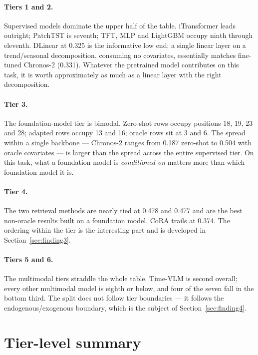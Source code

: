 \paragraph{Tiers 1 and 2.} Supervised models dominate the upper half of the table.
iTransformer leads outright; PatchTST is seventh; TFT, MLP and LightGBM occupy ninth
through eleventh. DLinear at 0.325 is the informative low end: a single linear layer on a
trend/seasonal decomposition, consuming no covariates, essentially matches fine-tuned
Chronos-2 (0.331). Whatever the pretrained model contributes on this task, it is worth
approximately as much as a linear layer with the right decomposition.

\paragraph{Tier 3.} The foundation-model tier is bimodal. Zero-shot rows occupy positions
18, 19, 23 and 28; adapted rows occupy 13 and 16; oracle rows sit at 3 and 6. The spread
within a single backbone --- Chronos-2 ranges from 0.187 zero-shot to 0.504 with oracle
covariates --- is larger than the spread across the entire supervised tier. On this task,
what a foundation model is \emph{conditioned on} matters more than which foundation model it
is.

\paragraph{Tier 4.} The two retrieval methods are nearly tied at 0.478 and 0.477 and are the
best non-oracle results built on a foundation model. CoRA trails at 0.374. The ordering
within the tier is the interesting part and is developed in Section~\ref{sec:finding3}.

\paragraph{Tiers 5 and 6.} The multimodal tiers straddle the whole table. Time-VLM is second
overall; every other multimodal model is eighth or below, and four of the seven fall in the
bottom third. The split does not follow tier boundaries --- it follows the
endogenous/exogenous boundary, which is the subject of Section~\ref{sec:finding4}.

\section{Tier-level summary}
\label{sec:tier-summary}

